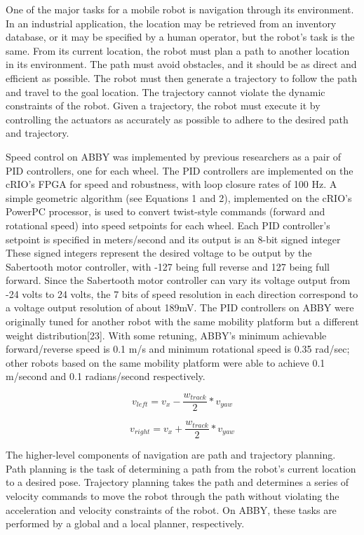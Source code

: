 \documentclass[]{cwru} %
\begin{document}
One of the major tasks for a mobile robot is navigation through its
environment. In an industrial application, the location may be retrieved
from an inventory database, or it may be specified by a human operator,
but the robot's task is the same. From its current location, the robot
must plan a path to another location in its environment. The path must
avoid obstacles, and it should be as direct and efficient as possible.
The robot must then generate a trajectory to follow the path and travel
to the goal location. The trajectory cannot violate the dynamic
constraints of the robot. Given a trajectory, the robot must execute it
by controlling the actuators as accurately as possible to adhere to the
desired path and trajectory.

Speed control on ABBY was implemented by previous researchers as a pair
of PID controllers, one for each wheel. The PID controllers are
implemented on the cRIO's FPGA for speed and robustness, with loop
closure rates of 100 Hz. A simple geometric algorithm (see Equations 1
and 2), implemented on the cRIO's PowerPC processor, is used to convert
twist-style commands (forward and rotational speed) into speed setpoints
for each wheel. Each PID controller's setpoint is specified in
meters/second and its output is an 8-bit signed integer These signed
integers represent the desired voltage to be output by the Sabertooth
motor controller, with -127 being full reverse and 127 being full
forward. Since the Sabertooth motor controller can vary its voltage
output from -24 volts to 24 volts, the 7 bits of speed resolution in
each direction correspond to a voltage output resolution of about 189mV.
The PID controllers on ABBY were originally tuned for another robot with
the same mobility platform but a different weight distribution{[}23{]}.
With some retuning, ABBY's minimum achievable forward/reverse speed is
0.1 m/s and minimum rotational speed is 0.35 rad/sec; other robots based
on the same mobility platform were able to achieve 0.1 m/second and 0.1
radians/second respectively.

\begin{equation}
\label{eq1}
 v_{left} = v_x - \frac{w_{track}}{2} * v_{yaw}
\end{equation}

\begin{equation}
\label{eq2}
v_{right} = v_x + \frac{w_{track}}{2} * v_{yaw}
\end{equation}

The higher-level components of navigation are path and trajectory
planning. Path planning is the task of determining a path from the
robot's current location to a desired pose. Trajectory planning takes
the path and determines a series of velocity commands to move the robot
through the path without violating the acceleration and velocity
constraints of the robot. On ABBY, these tasks are performed by a global
and a local planner, respectively.
\end{document}
